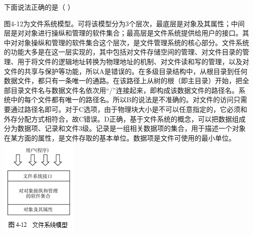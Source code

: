 \question 下面说法正确的是（ ）
\par{}
\begin{solution}图4-12为文件系统模型。可将该模型分为3个层次，最底层是对象及其属性；中间层是对对象进行操纵和管理的软件集合；最高层是文件系统提供给用户的接口。其中对对象操纵和管理的软件集合这个层次，是文件管理系统的核心部分。文件系统的功能大多是在这一层实现的，其中包括对文件存储空间的管理、对文件目录的管理、用于将文件的逻辑地址转换为物理地址的机制、对文件读和写的管理，以及对文件的共享与保护等功能，所以A是错误的。在多级目录结构中，从根目录到任何数据文件，都只有一条唯一的通路。在该路径上从树的根（即主目录）开始，把全部目录文件名与数据文件名依次用``/''连接起来，即构成该数据文件的路径名。系统中的每个文件都有唯一的路径名。所以B的说法是不准确的。对文件的访问只需要通过路径名即可。对于C选项，由于物理块大小是不可以任意指定的，它必须和外存分配方式相符合，故C错误。D正确，基于文件系统的概念，可以把数据组成分为数据项、记录和文件3级。记录是一组相关数据项的集合，用于描述一个对象在某方面的属性，是文件存取的基本单位。数据项是文件可使用的最小单位。
\includegraphics[width=1.48958in,height=1.89583in]{computerassets/7FB65A386B59F21177FA84BE6D2561FB.png}
\end{solution}
